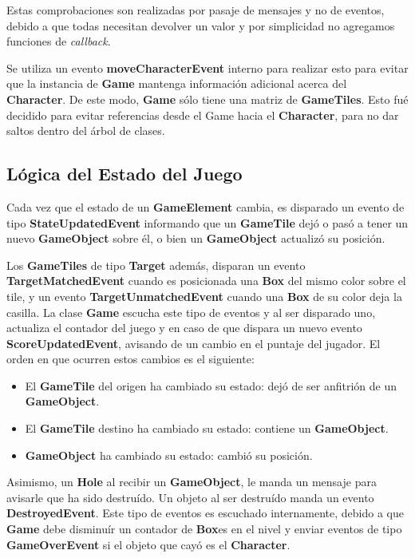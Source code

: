 \documentclass[a4paper,12pt,titlepage]{article}
\begin{document}
Estas comprobaciones son realizadas por pasaje de mensajes y no de eventos, debido a que todas necesitan devolver un valor y por simplicidad no agregamos funciones de \emph{callback}.

Se utiliza un evento \textbf{moveCharacterEvent} interno para realizar esto para evitar que la instancia de \textbf{Game} mantenga información adicional acerca del \textbf{Character}. De este modo, \textbf{Game} sólo tiene una matriz de \textbf{GameTiles}. Esto fué decidido para evitar referencias desde el Game hacia el \textbf{Character}, para no dar saltos dentro del árbol de clases.

\subsection{Lógica del Estado del Juego}

Cada vez que el estado de un \textbf{GameElement} cambia, es disparado un evento de tipo \textbf{StateUpdatedEvent} informando que un \textbf{GameTile} dejó o pasó a tener un nuevo \textbf{GameObject} sobre él, o bien un \textbf{GameObject} actualizó su posición.

Los \textbf{GameTiles} de tipo \textbf{Target} además, disparan un evento \textbf{TargetMatchedEvent} cuando es posicionada una \textbf{Box} del mismo color sobre el tile, y un evento \textbf{TargetUnmatchedEvent} cuando una \textbf{Box} de su color deja la casilla. La clase \textbf{Game} escucha este tipo de eventos y al ser disparado uno, actualiza el contador del juego y en caso de que dispara un nuevo evento \textbf{ScoreUpdatedEvent}, avisando de un cambio en el puntaje del jugador. El orden en que ocurren estos cambios es el siguiente:

\begin{itemize}
	\item El \textbf{GameTile} del origen ha cambiado su estado: dejó de ser anfitrión de un \textbf{GameObject}.
	\item El \textbf{GameTile} destino ha cambiado su estado: contiene un \textbf{GameObject}.
	\item \textbf{GameObject} ha cambiado su estado: cambió su posición.
\end{itemize}

Asimismo, un \textbf{Hole} al recibir un \textbf{GameObject}, le manda un mensaje para avisarle que ha sido destruído. Un objeto al ser destruído manda un evento \textbf{DestroyedEvent}. Este tipo de eventos es escuchado internamente, debido a que \textbf{Game} debe disminuír un contador de \textbf{Box}es en el nivel y enviar eventos de tipo \textbf{GameOverEvent} si el objeto que cayó es el \textbf{Character}.
\end{document}
